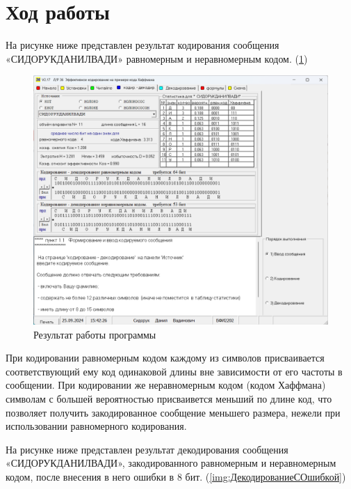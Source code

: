 \documentclass[14pt]{extarticle}
\makeatletter
\newcommand{\numbersections}{\renewcommand{\Hy@numberline}[1]{##1~}}
\let\oldsection\section
\renewcommand{\section}{\numbersections\oldsection}
\makeatother
\begin{document}
\section{Ход работы}

На рисунке ниже представлен результат кодирования сообщения «СИДОРУКДАНИЛВАДИ» равномерным и неравномерным кодом. (\ref{img:Кодирование})

\begin{figure}[H]
    \centering
    \includegraphics[width=1.0\linewidth]{Кодирование.png}
    \caption{Результат работы программы\label{img:Кодирование}}
\end{figure}

При кодировании равномерным кодом каждому из символов присваивается соответствующий ему код одинаковой длины вне зависимости от его частоты в сообщении. При кодировании же неравномерным кодом (кодом Хаффмана) символам с большей вероятностью присваивется меньший по длине код, что позволяет получить закодированное сообщение меньшего размера, нежели при использовании равномерного кодирования.

На рисунке ниже представлен результат декодирования сообщения «СИДОРУКДАНИЛВАДИ», закодированного равномерным и неравномерным кодом, после внесения в него ошибки в 8 бит. (\ref{img:ДекодированиеСОшибкой})
\end{document}
